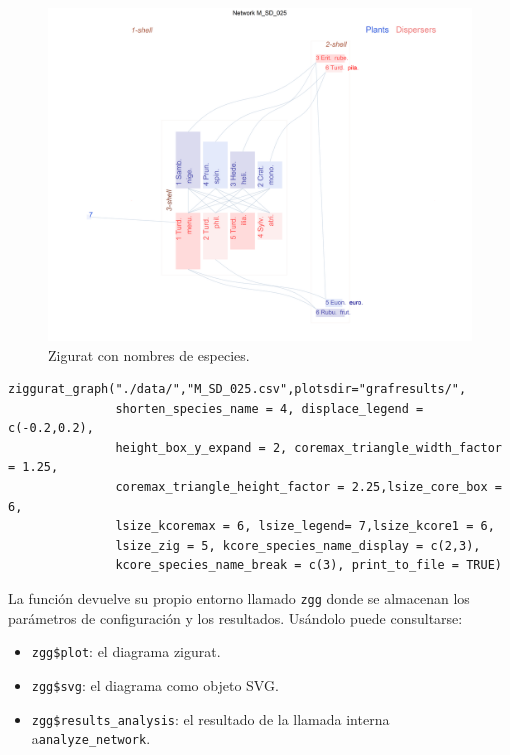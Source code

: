 \begin{figure}[hp!]
\centering
\includegraphics[scale=0.45]{ManFigs/M_SD_025_ziggurat.png}
\caption {Zigurat con nombres de especies.}
\label{fig:AKMAN_ziggurat_025}
\end{figure}

\fontsize{3.5mm}{3.5mm}\selectfont
\begin{verbatim}
ziggurat_graph("./data/","M_SD_025.csv",plotsdir="grafresults/",
               shorten_species_name = 4, displace_legend = c(-0.2,0.2),
               height_box_y_expand = 2, coremax_triangle_width_factor = 1.25,
               coremax_triangle_height_factor = 2.25,lsize_core_box = 6,
               lsize_kcoremax = 6, lsize_legend= 7,lsize_kcore1 = 6, 
               lsize_zig = 5, kcore_species_name_display = c(2,3), 
               kcore_species_name_break = c(3), print_to_file = TRUE)

\end{verbatim}
\normalsize

\clearpage

\noindent La función devuelve su propio entorno llamado \texttt{zgg} donde se almacenan los parámetros de configuración y los resultados. Usándolo puede consultarse:

\begin{itemize}

\item \texttt{zgg\$plot}:  el diagrama zigurat.

\item \texttt{zgg\$svg}: el diagrama como objeto SVG.

\item \texttt{zgg\$results\_analysis}: el resultado de la llamada interna a\texttt{analyze\_network}.

\end{itemize}
 

